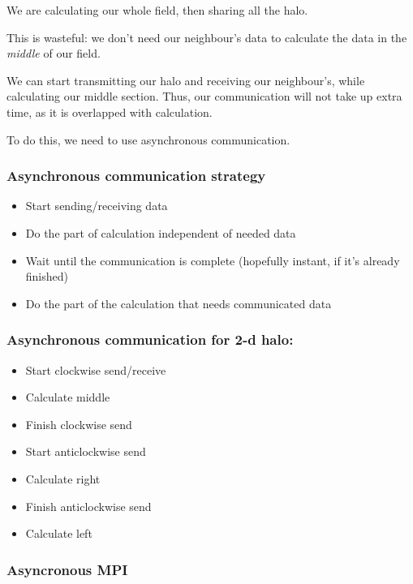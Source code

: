 We are calculating our whole field, then sharing all the halo.

This is wasteful: we don't need our neighbour's data to calculate the
data in the \emph{middle} of our field.

We can start transmitting our halo and receiving our neighbour's, while
calculating our middle section. Thus, our communication will not take up
extra time, as it is overlapped with calculation.

To do this, we need to use asynchronous communication.

\subsubsection{Asynchronous communication
strategy}\label{asynchronous-communication-strategy}

\begin{itemize}
\itemsep1pt\parskip0pt
\item
  Start sending/receiving data
\item
  Do the part of calculation independent of needed data
\item
  Wait until the communication is complete (hopefully instant, if it's
  already finished)
\item
  Do the part of the calculation that needs communicated data
\end{itemize}

\subsubsection{Asynchronous communication for 2-d
halo:}\label{asynchronous-communication-for-2-d-halo}

\begin{itemize}
\itemsep1pt\parskip0pt
\item
  Start clockwise send/receive
\item
  Calculate middle
\item
  Finish clockwise send
\item
  Start anticlockwise send
\item
  Calculate right
\item
  Finish anticlockwise send
\item
  Calculate left
\end{itemize}

\subsubsection{Asyncronous MPI}\label{asyncronous-mpi}

